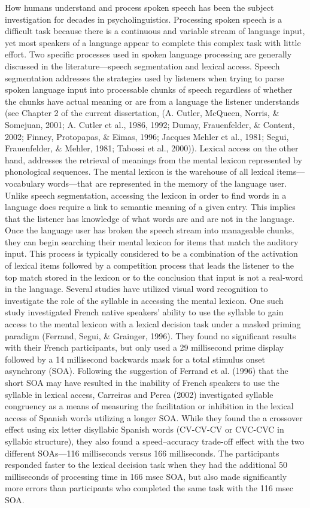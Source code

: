 How humans understand and process spoken speech has been the subject investigation for decades in psycholinguistics. Processing spoken speech is a difficult task because there is a continuous and variable stream of language input, yet most speakers of a language appear to complete this complex task with little effort. Two specific processes used in spoken language processing are generally discussed in the literature—speech segmentation and lexical access. 
Speech segmentation addresses the strategies used by listeners when trying to parse spoken language input into processable chunks of speech regardless of whether the chunks have actual meaning or are from a language the listener understands (see Chapter 2 of the current dissertation, (A. Cutler, McQueen, Norris, \& Somejuan, 2001; A. Cutler et al., 1986, 1992; Dumay, Frauenfelder, \& Content, 2002; Finney, Protopapas, \& Eimas, 1996; Jacques Mehler et al., 1981; Segui, Frauenfelder, \& Mehler, 1981; Tabossi et al., 2000)). Lexical access on the other hand, addresses the retrieval of meanings from the mental lexicon represented by phonological sequences. The mental lexicon is the warehouse of all lexical items—vocabulary words—that are represented in the memory of the language user. Unlike speech segmentation, accessing the lexicon in order to find words in a language does require a link to semantic meaning of a given entry. This implies that the listener has knowledge of what words are and are not in the language. Once the language user has broken the speech stream into manageable chunks, they can begin searching their mental lexicon for items that match the auditory input. This process is typically considered to be a combination of the activation of lexical items followed by a competition process that leads the listener to the top match stored in the lexicon or to the conclusion that input is not a real-word in the language.
Several studies have utilized visual word recognition to investigate the role of the syllable in accessing the mental lexicon. One such study investigated French native speakers’ ability to use the syllable to gain access to the mental lexicon with a lexical decision task under a masked priming paradigm (Ferrand, Segui, \& Grainger, 1996). They found no significant results with their French participants, but only used a 29 millisecond prime display followed by a 14 millisecond backwards mask for a total stimulus onset asynchrony (SOA). Following the suggestion of Ferrand et al. (1996) that the short SOA may have resulted in the inability of French speakers to use the syllable in lexical access, Carreiras and Perea (2002) investigated syllable congruency as a means of measuring the facilitation or inhibition in the lexical access of Spanish words utilizing a longer SOA. While they found the a crossover effect using six letter disyllabic Spanish words (CV-CV-CV or CVC-CVC in syllabic structure), they also found a speed–accuracy trade-off effect with the two different SOAs—116 milliseconds versus 166 milliseconds. The participants responded faster to the lexical decision task when they had the additional 50 milliseconds of processing time in 166 msec SOA, but also made significantly more errors than participants who completed the same task with the 116 msec SOA.

